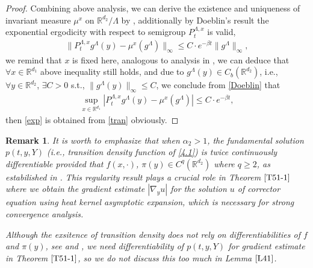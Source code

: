 \documentclass[11pt,reqno]{amsart}
\newtheorem{remark}{\indent Remark}[section]
\numberwithin{equation}{section}
\newcommand{\R}{\mathbb{R}}
\newcommand{\al}{\alpha}
\newcommand{\mb}{\mathbb}
\begin{document}
\begin{proof}
Combining above analysis, we can derive the existence and uniqueness of invariant measure $\mu^{x}$ on $\R^{d_{2}}/\Lambda$ by  \cite[365, Theorem 3.1]{BLP}, additionally by Doeblin's result \cite[365, Theorem 3.1]{BLP} %
the exponential ergodicity with respect to semigroup $P_{t}^{\Lambda,x}$ is valid,
	\begin{align}\label{Doeblin}
\|P_{t}^{\Lambda,x}g^\Lambda(y)-\mu^x(g^\Lambda)\|_{\infty}\leq C\cdot e^{-\beta t}\|g^\Lambda\|_{\infty},
\end{align}
we remind that $x$ is fixed here, analogous to analysis in \cite[349, Proposition 3.2, Proposition 3.3]{SXX}, we can deduce that $\forall x\in \mb{R}^{d_1}$ above inequality still holds, and due to $ g^\Lambda(y)\in  C_{b}(\mathbb{R}^{d_{2}})$, i.e., $\forall y\in \mathbb{R}^{d_{2}}$, $\exists C>0$ s.t., $\|g^\Lambda(y)\|_{\infty}\leq C $, we conclude from \eqref{Doeblin} that
	\begin{align*}
	\sup_{x\in \mathbb{R}^{d_{1}}}| P_{t}^{\Lambda,x}g^\Lambda(y)-\mu^x(g^\Lambda)|\leq C\cdot e^{-\beta t},
\end{align*}
then \eqref{exp} is obtained from \eqref{tran} obviously.
\end{proof}
\begin{remark}\label{R41}
It is worth to emphasize that when $\al_{2}>1$, the fundamental solution $p(t,y,Y)$ (i.e., transition density function of \eqref{4.1}) is twice continuously differentiable provided that $f(x,\cdot)$, $\pi(y) \in C^{q}(\mb{R}^{d_{2}})$ where $q\geq2$, as estabilished in \cite[Theorem 3.1, 743]{VK}. This regularity result plays a crucial role in Theorem $\ref{T51-1}$ where we obtain the gradient estimate $|\nabla_{y}u|$ for the solution $u$ of corrector equation using heat kernel asymptotic expansion, which is necessary for strong convergence analysis.

Although the exsitence of transition density does not rely on differentiabilities of $f$ and $\pi(y)$, see \cite[743, Remark]{VK} and \cite{ANK}, we need differentiability of $p(t,y,Y)$ for gradient estimate in Theorem $\ref{T51-1}$, so we do not discuss this too much in Lemma $\ref{L41}$.

\end{remark}
\fi
\end{document}
